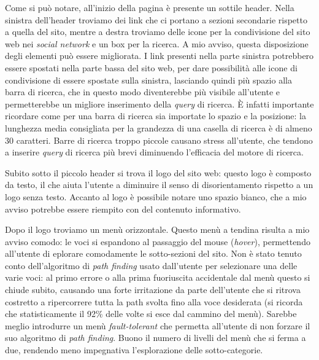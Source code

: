 Come si pu\`o notare, all'inizio della pagina \`e presente un sottile header. Nella sinistra dell'header troviamo dei link che ci portano a sezioni secondarie rispetto a quella del sito, mentre a destra troviamo delle icone per la condivisione del sito web nei \textit{social network} e un box per la ricerca.
A mio avviso, questa disposizione degli elementi pu\`o essere migliorata. I link presenti nella parte sinistra potrebbero essere spostati nella parte bassa del sito web, per dare possibilit\`a alle icone di condivisione di essere spostate sulla sinistra, lasciando quindi pi\`u spazio alla barra di ricerca, che in questo modo diventerebbe pi\`u visibile all'utente e permetterebbe un migliore inserimento della \textit{query} di ricerca. \`E infatti importante ricordare come per una barra di ricerca sia importate lo spazio e la posizione: la lunghezza media consigliata per la grandezza di una casella di ricerca è di almeno 30 caratteri. Barre di ricerca troppo piccole causano stress all'utente, che tendono a inserire \textit{query} di ricerca pi\`u brevi diminuendo l'efficacia del motore di ricerca.


Subito sotto il piccolo header si trova il logo del sito web: questo logo \`e composto da testo, il che aiuta l'utente a diminuire il senso di disorientamento rispetto a un logo senza testo.
Accanto al logo \`e possibile notare uno spazio bianco, che a mio avviso potrebbe essere riempito con del contenuto informativo.


Dopo il logo troviamo un men\`u orizzontale. Questo men\`u a tendina risulta a mio avviso comodo: le voci si espandono al passaggio del mouse (\textit{hover}), permettendo all'utente di eplorare comodamente le sotto-sezioni del sito. Non \`e stato tenuto conto dell'algoritmo di \textit{path finding} usato dall'utente per selezionare una delle varie voci: al primo errore o alla prima fuoriuscita accidentale dal men\`u questo si chiude subito, causando una forte irritazione da parte dell'utente che si ritrova costretto a ripercorrere tutta la path svolta fino alla voce desiderata (si ricorda che statisticamente il 92\% delle volte si esce dal cammino del men\`u). Sarebbe meglio introdurre un men\`u \textit{fault-tolerant} che permetta all'utente di non forzare il suo algoritmo di \textit{path finding}. Buono il numero di livelli del men\`u che si ferma a due, rendendo meno impegnativa l'esplorazione delle sotto-categorie.

